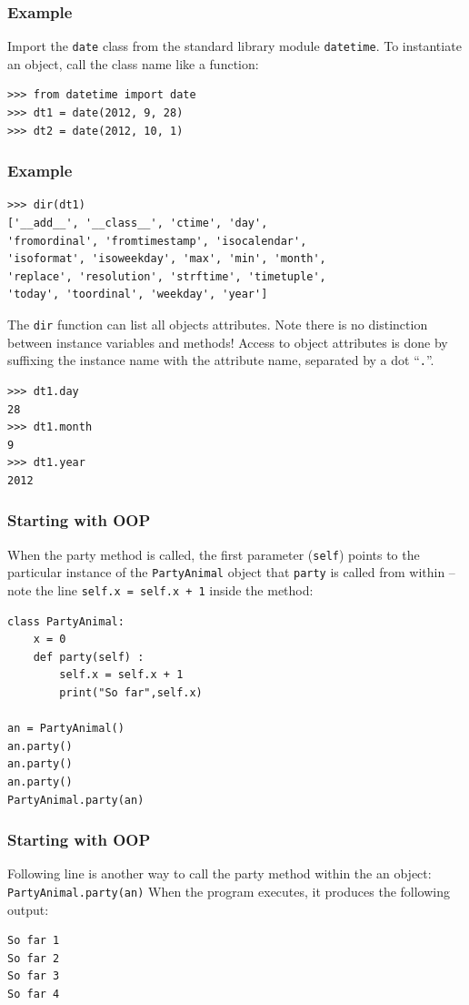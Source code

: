 \begin{frame}[fragile]\frametitle{Example}
Import the \lstinline{date} class from the standard library module \lstinline{datetime}. To instantiate an object, call the class name like a function:
\begin{lstlisting}
>>> from datetime import date
>>> dt1 = date(2012, 9, 28)
>>> dt2 = date(2012, 10, 1)
\end{lstlisting}
\end{frame}

\begin{frame}[fragile] \frametitle{Example}
\begin{lstlisting}
>>> dir(dt1)
['__add__', '__class__', 'ctime', 'day',
'fromordinal', 'fromtimestamp', 'isocalendar',
'isoformat', 'isoweekday', 'max', 'min', 'month',
'replace', 'resolution', 'strftime', 'timetuple',
'today', 'toordinal', 'weekday', 'year']
\end{lstlisting}
The \lstinline{dir} function can list all objects attributes. Note there is no distinction between instance variables and methods! Access to object attributes is done by suffixing the instance name with the attribute name, separated by a dot ``\lstinline{.}''.
\begin{lstlisting}
>>> dt1.day
28
>>> dt1.month
9
>>> dt1.year
2012
\end{lstlisting}
\end{frame}

\begin{frame}[fragile]\frametitle{Starting with OOP}
When the party method is called, the first parameter (\texttt{self}) points to the particular
instance of the \texttt{PartyAnimal} object that \texttt{party} is called from within -- note the
line \lstinline|self.x = self.x + 1| inside the method:
\begin{lstlisting}
class PartyAnimal:
	x = 0
	def party(self) :
		self.x = self.x + 1
		print("So far",self.x)

an = PartyAnimal()
an.party()
an.party()
an.party()
PartyAnimal.party(an)
\end{lstlisting}
\end{frame}

\begin{frame}[fragile]\frametitle{Starting with OOP}
Following line is another way to call the party method within
the an object: \lstinline|PartyAnimal.party(an)|
When the program executes, it produces the following output:
\begin{lstlisting}
So far 1
So far 2
So far 3
So far 4
\end{lstlisting}
\end{frame}


